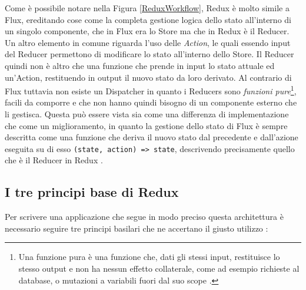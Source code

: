 Come è possibile notare nella Figura \ref{ReduxWorkflow}, Redux è molto simile a Flux, ereditando cose come la completa gestione logica dello stato all'interno di un singolo componente, che in Flux era lo Store ma che in Redux è il Reducer. Un altro elemento in comune riguarda l'uso delle \textit{Action}, le quali essendo input del Reducer permettono di modificare lo stato all'interno dello Store. Il Reducer quindi non è altro che una funzione che prende in input lo stato attuale ed un'Action, restituendo in output il nuovo stato da loro derivato.
Al contrario di Flux tuttavia non esiste un Dispatcher in quanto i Reducers sono \textit{funzioni pure}\footnote{Una funzione pura è una funzione che, dati gli stessi input, restituisce lo stesso output e non ha nessun effetto collaterale, come ad esempio richieste al database, o mutazioni a variabili fuori dal suo scope \cite{FranklinOnPureFunctions}.}, facili da comporre e che non hanno quindi bisogno di un componente esterno che li gestisca. Questa può essere vista sia come una differenza di implementazione che come un miglioramento, in quanto la gestione dello stato di Flux è sempre descritta come una funzione che deriva il nuovo stato dal precedente e dall'azione eseguita su di esso \texttt{(state, action) => state}, descrivendo precisamente quello che è il Reducer in Redux \cite{ReduxDocumentation}.

\subsection{I tre principi base di Redux}
Per scrivere una applicazione che segue in modo preciso questa architettura è necessario seguire tre principi basilari che ne accertano il giusto utilizzo \cite{ReduxDocumentation}:

